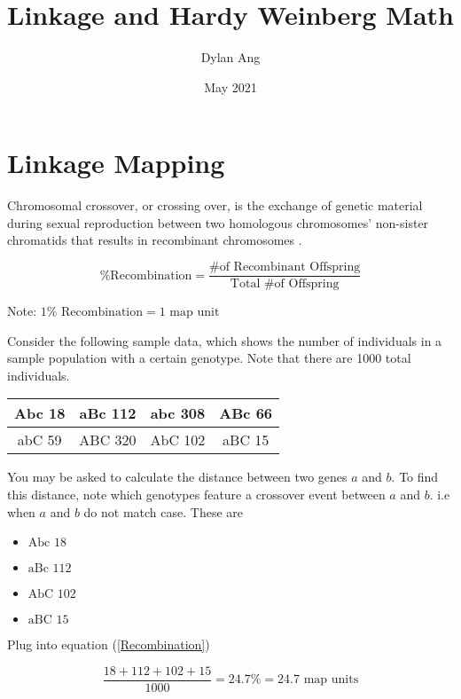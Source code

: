\documentclass[12pt]{article}
\title{Linkage and Hardy Weinberg Math}
\date{May 2021}
\author{Dylan Ang}
\begin{document}
\maketitle

\tableofcontents

\section{Linkage Mapping}

Chromosomal crossover, or crossing over, is the exchange of genetic material during sexual reproduction between two homologous chromosomes' non-sister chromatids that results in recombinant chromosomes \cite{crossover}.

\begin{equation}\label{Recombination}
    \text{\% Recombination} = \frac{\text{\# of Recombinant Offspring}}{\text{Total \# of Offspring}}
\end{equation}

Note: $1\% \text{ Recombination} = \text{1 map unit}$

Consider the following sample data, which shows the number of individuals in a sample population with a certain genotype. Note that there are 1000 total individuals.

\begin{table}[ht]
    \centering
    \begin{tabular}{*4{|c}|}
        \hline
        Abc 18 & aBc 112 & abc 308 & ABc 66 \\ \hline
        abC 59 & ABC 320 & AbC 102 & aBC 15 \\ \hline
    \end{tabular}
\end{table}

You may be asked to calculate the distance between two genes $a$ and $b$. To find this distance, note which genotypes feature a crossover event between $a$ and $b$. i.e when $a$ and $b$ do not match case. These are

\begin{itemize}
    \item $\text{Abc } 18$
    \item $\text{aBc } 112$
    \item $\text{AbC } 102$
    \item $\text{aBC } 15$
\end{itemize}

Plug into equation (\ref{Recombination})

$$\frac{18+112+102+15}{1000} = 24.7\% = 24.7 \text{ map units}$$
\end{document}
